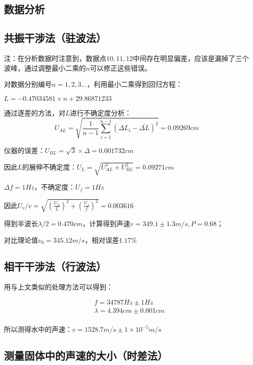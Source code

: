 \documentclass[a4paper]{ltxdoc}
\begin{document}
\begin{multicols}{2}
    \section{数据分析}
    \subsection{共振干涉法（驻波法）}
    注：在分析数据时注意到，数据点$10,11,12$中间存在明显偏差，应该是漏掉了三个波峰，通过调整最小二乘的$n$可以修正这些错误。

    对数据分别编号$n=1,2,3\ldots$，利用最小二乘得到回归方程：

    \smallskip
    $L = -0.47034581\times n + 29.86871233$

    \smallskip

    通过逐差的方法，对$L$进行不确定度分析：
    $$
        U_{AL} = \sqrt{\frac{1}{n-1} \sum_{i=1}^{n-1} (\Delta L_{i} -\bar{\Delta L})^2} = 0.09269 cm
    $$

    仪器的误差：$U_{BL} =\sqrt 3 \times \Delta = 0.001732cm$

    \smallskip
    因此$L$的展伸不确定度：$U_{L} = \sqrt{U_{AL}^2 + U_{BL}^2} = 0.09271 cm$

    \smallskip
    $\Delta f = 1Hz$，不确定度：$U_{f} =1Hz$

    \smallskip
    因此$U_{v} / v=\sqrt{(\frac {U_{L}} {L})^{2} + (\frac {U_{f}} {f})^{2}} = 0.003616$

    \smallskip
    得到半波长$\lambda / 2 = 0.470 cm$，计算得到声速$v = 349.1\pm 1.3 m/s,P=0.68$；

    \smallskip
    对比理论值$v_0 = 345.12 m/s$，相对误差$1.17\%$

    \subsection{相干干涉法（行波法）}
    用与上文类似的处理方法可以得到：

    $$
        \begin{aligned}
             & f = 34787 Hz \pm 1 Hz           \\
             & \lambda = 4.394 cm \pm 0.001 cm \\
        \end{aligned}
    $$

    所以测得水中的声速：$v = 1528.7 m/s \pm 1\times 10^{-5} m/s$

    \subsection{测量固体中的声速的大小（时差法）}


\end{multicols}
\end{document}
